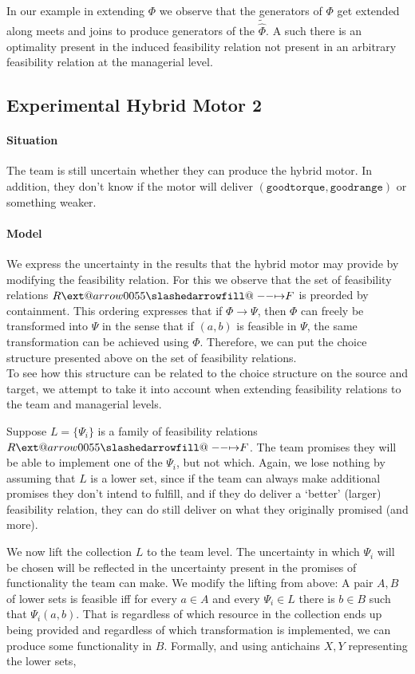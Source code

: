 \documentclass[12pt]{article}
\makeatletter
\theoremstyle{definition}
\theoremstyle{plain}
\theoremstyle{plain}
\theoremstyle{plain}
\theoremstyle{plain}
\theoremstyle{remark}
\theoremstyle{remark}
\def\slashedarrowfill@#1#2#3#4#5{%
	$\m@th\thickmuskip0mu\medmuskip\thickmuskip\thinmuskip\thickmuskip
	\relax#5#1\mkern-7mu%
	\cleaders\hbox{$#5\mkern-2mu#2\mkern-2mu$}\hfill
	\mathclap{#3}\mathclap{#2}%
	\cleaders\hbox{$#5\mkern-2mu#2\mkern-2mu$}\hfill
	\mkern-7mu#4$%
}
\def\rightslashedarrowfill@{%
	\slashedarrowfill@\relbar\relbar\mapstochar\rightarrow}
\newcommand\xslashedrightarrow[2][]{%
	\ext@arrow 0055{\rightslashedarrowfill@}{#1}{#2}}
\makeatother
\begin{document}
In our example in extending $\Phi$ we observe that the generators of $\Phi$ get extended along meets and joins to produce generators of the $\tilde\hat\Phi$. A such there is an optimality present in the induced feasibility relation not present in an arbitrary feasibility relation at the managerial level.

\subsection{Experimental Hybrid Motor 2}
\paragraph{Situation} The team is still uncertain whether they can produce the hybrid motor. In addition, they don't know if the motor will deliver $\mathtt{(good torque, good range)}$ or something weaker.

\paragraph{Model} We express the uncertainty in the results that the hybrid motor may provide by modifying the feasibility relation. For this we observe that the set of feasibility relations $R \xslashedrightarrow{} F$ is preorded by containment. This ordering expresses that if $\Phi \rightarrow \Psi$, then $\Phi$ can freely be transformed into $\Psi$ in the sense that if $(a,b)$ is feasible in $\Psi$, the same transformation can be achieved using $\Phi$. Therefore, we can put the choice structure presented above on the set of feasibility relations. \\

To see how this structure can be related to the choice structure on the source and target, we attempt to take it into account when extending feasibility relations to the team and managerial levels.

Suppose $L = \{\Psi_i\}$ is a family of feasibility relations $R \xslashedrightarrow{} F$. The team promises they will be able to implement one of the $\Psi_i$, but not which. Again, we lose nothing by assuming that $L$ is a lower set, since if the team can always make additional promises they don't intend to fulfill, and if they do deliver a `better' (larger) feasibility relation, they can do still deliver on what they originally promised (and more).

We now lift the collection $L$ to the team level. The uncertainty in which $\Psi_i$ will be chosen will be reflected in the uncertainty present in the promises of functionality the team can make. We modify the lifting from above: A pair $A,B$ of lower sets is feasible iff for every $a \in A$ and every $\Psi_i \in L$ there is $b \in B$ such that $\Psi_i(a,b)$. That is regardless of which resource in the collection ends up being provided and regardless of which transformation is implemented, we can produce some functionality in $B$. Formally, and using antichains $X,Y$ representing the lower sets,
\end{document}
